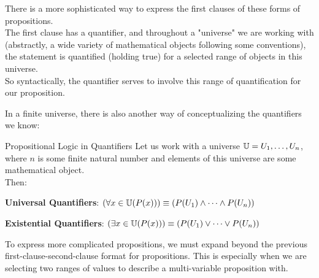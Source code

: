 There is a more sophisticated way to express the first clauses of these forms of propositions. \\
The first clause has a quantifier, and throughout a "universe" we are working with (abstractly, a wide variety of mathematical objects following some conventions), the statement is quantified (holding true) for a selected range of objects in this universe. \\
So syntactically, the quantifier serves to involve this range of quantification for our proposition.

In a finite universe, there is also another way of conceptualizing the quantifiers we know:
\begin{ln-think}{Propositional Logic in Quantifiers}{}
    Let us work with a universe $\mathbb{U} = {U_1, \dots, U_n}$, where $n$ is some finite natural number and elements of this universe are some mathematical object. \\
    Then:
    \begin{bindenum}
        \item \textbf{Universal Quantifiers}: $(\forall x \in \mathbb{U} (P(x))) \equiv (P(U_1) \land \dots \land P(U_n))$
        \item \textbf{Existential Quantifiers}: $(\exists x \in \mathbb{U} (P(x))) \equiv (P(U_1) \lor \dots \lor P(U_n))$
    \end{bindenum}
\end{ln-think}
To express more complicated propositions, we must expand beyond the previous first-clause-second-clause format for propositions. This is especially when we are selecting two ranges of values to describe a multi-variable proposition with.
